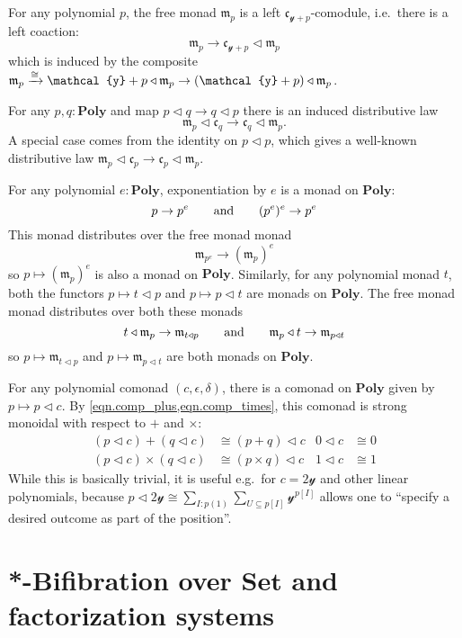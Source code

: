 \documentclass[11pt, one side, article]{memoir}
\theoremstyle{definition}
\theoremstyle{plain}
\renewcommand{\ss}{\subseteq}
\newcommand{\Cat}[1]{\mathbf{#1}}%
\newcommand{\To}[2][]{\xrightarrow[#1]{\tn{$#2$}}}
\newcommand{\tn}[1]{\textnormal{#1}}
\newcommand{\smset}{\Cat{Set}}
\newcommand{\yon}{{\mathcal{y}}}
\newcommand{\poly}{\Cat{Poly}}
\newcommand{\0}{\textsf{0}}
\newcommand{\1}{\tn{\textsf{1}}}
\newcommand{\tri}{\mathbin{\triangleleft}}
\newcommand{\cofree}{\mathfrak{c}}
\newcommand{\free}{\mathfrak{m}}
\newcommand{\hh}[2][]{#1 \tn{#2} #1}
\newcommand{\qqand}{\hh[\qquad]{and}}
\begin{document}
For any polynomial $p$, the free monad $\free_p$ is a left $\cofree_{\yon+p}$-comodule, i.e.\ there is a left coaction:
\begin{equation}
	\free_p\to\cofree_{\yon+p}\tri\free_p
\end{equation}
which is induced by the composite $\free_p\To{\cong}\yon+p\tri\free_p\to(\yon+p)\tri\free_p$. 

For any $p,q:\poly$ and map $p\tri q\to q\tri p$ there is an induced distributive law
\begin{equation}
  \free_p\tri\cofree_q\to\cofree_q\tri\free_p.
\end{equation}
A special case comes from the identity on $p\tri p$, which gives a well-known distributive law $\free_p\tri\cofree_p\to\cofree_p\tri\free_p$.

For any polynomial $e:\poly$, exponentiation by $e$ is a monad on $\poly$:
\begin{equation}
	p\to p^e
	\qqand
	(p^e)^e\to p^e
\end{equation}
This monad distributes over the free monad monad
\begin{equation}
	\free_{p^e}\to(\free_p)^e
\end{equation}
so $p\mapsto(\free_p)^e$ is also a monad on $\poly$. Similarly, for any polynomial monad $t$, both the functors $p\mapsto t\tri p$ and $p\mapsto p\tri t$ are monads on $\poly$. The free monad monad distributes over both these monads
\begin{equation}
	t\tri\free_p\to\free_{t\tri p}
	\qqand
	\free_p\tri t\to\free_{p\tri t}
\end{equation}
so $p\mapsto \free_{t\tri p}$ and $p\mapsto \free_{p\tri t}$ are both monads on $\poly$.


For any polynomial comonad $(c,\epsilon,\delta)$, there is a comonad on $\poly$ given by $p\mapsto p\tri c$. By \cref{eqn.comp_plus,eqn.comp_times}, this comonad is strong monoidal with respect to $+$ and $\times$:
\begin{align}
	(p\tri c)+(q\tri c)&\cong (p+q)\tri c&0\tri c&\cong0\\
	(p\tri c)\times(q\tri c)&\cong (p\times q)\tri c&1\tri c&\cong1	
\end{align}
While this is basically trivial, it is useful e.g.\ for $c=2\yon$ and other linear polynomials, because $p\tri 2\yon\cong\sum_{I:p(1)}\sum_{U\ss p[I]}\yon^{p[I]}$ allows one to ``specify a desired outcome as part of the position''.


\chapter{*-Bifibration over $\smset$ and factorization systems}\label{chap.bifib}
\end{document}
